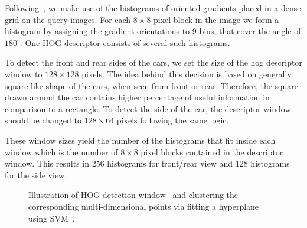 Following~\citet{dalal2005}, we make use of the histograms of oriented
gradients placed in a dense grid on the query images. For each $8 \times 8$
pixel block in the image we form a histogram by assigning the gradient
orientations to 9 bins, that cover the angle of $180^{\circ}$. One HOG
descriptor consists of several such histograms.

To detect the front and rear sides of the cars, we set the size of the hog
descriptor window to $128 \times 128$ pixels. The idea behind this decision is
based on generally square-like shape of the cars, when seen from front or
rear. Therefore, the square drawn around the car contains higher percentage of
useful information in comparison to a rectangle. To detect the side of the
car, the descriptor window should be changed to $128 \times 64$ pixels
following the same logic.

These window sizes yield the number of the histograms that fit inside each
window which is the number of $8 \times 8$ pixel blocks contained in the
descriptor window. This results in 256 histograms for front/rear view and 128
histograms for the side view.

\begin{figure}[t]%
\centering
{}
\caption{Illustration of HOG detection window~ and clustering the corresponding multi-dimensional points via fitting a hyperplane  using SVM~.}
\label{fig:det_to_svm}
\end{figure}


